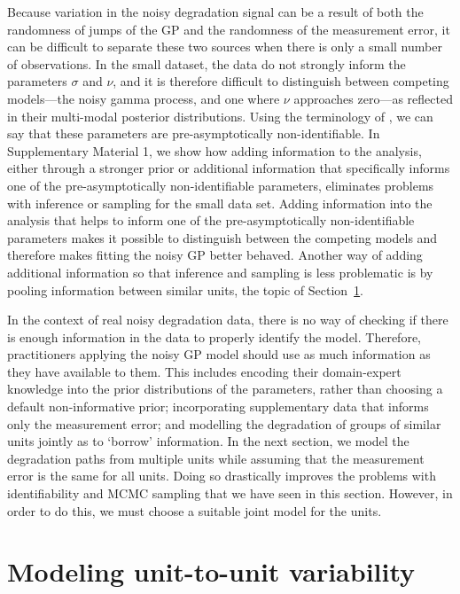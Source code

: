 \documentclass{article}
\begin{document}
Because variation in the noisy degradation signal can be a result of both the randomness of jumps of the GP and the randomness of the measurement error, it can be difficult to separate these two sources when there is only a small number of observations. In the small dataset, the data do not strongly inform the parameters $\sigma$ and $\nu$, and it is therefore difficult to distinguish between competing models---the noisy gamma process, and one where $\nu$ approaches zero---as reflected in their multi-modal posterior distributions.  Using the terminology of \citet{betancourt_2020}, we can say that these parameters are pre-asymptotically non-identifiable. In Supplementary Material 1, we show how adding information to the analysis, either through a stronger prior or additional information that specifically informs one of the pre-asymptotically non-identifiable parameters, eliminates problems with inference or sampling for the small data set. Adding information into the analysis that helps to inform one of the pre-asymptotically non-identifiable parameters makes it possible to distinguish between the competing models and therefore makes fitting the noisy GP better behaved. Another way of adding additional information so that inference and sampling is less problematic is by pooling information between similar units, the topic of Section~\ref{sec:unit-to-unit}.

In the context of real noisy degradation data, there is no way of checking if there is enough information in the data to properly identify the model. Therefore, practitioners applying the noisy GP model should use as much information as they have available to them. This includes encoding their domain-expert knowledge into the prior distributions of the parameters, rather than choosing a default non-informative prior; incorporating supplementary data that informs only the measurement error; and modelling the degradation of groups of similar units jointly as to `borrow' information. In the next section, we model the degradation paths from multiple units while assuming that the measurement error is the same for all units. Doing so drastically improves the problems with identifiability and MCMC sampling that we have seen in this section. However, in order to do this, we must choose a suitable joint model for the units.

\section{Modeling unit-to-unit variability}
\label{sec:unit-to-unit}
\end{document}
